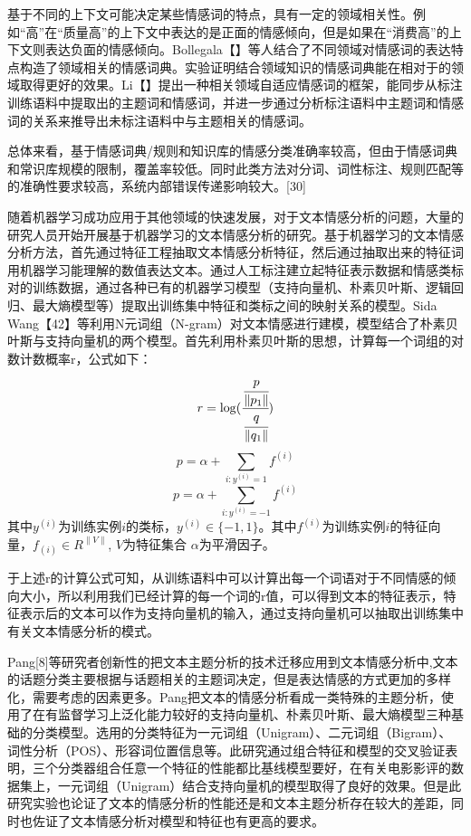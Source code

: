 基于不同的上下文可能决定某些情感词的特点，具有一定的领域相关性。例如“高”在“质量高”的上下文中表达的是正面的情感倾向，但是如果在“消费高”的上下文则表达负面的情感倾向。Bollegala【】等人结合了不同领域对情感词的表达特点构造了领域相关的情感词典。实验证明结合领域知识的情感词典能在相对于的领域取得更好的效果。Li【】提出一种相关领域自适应情感词的框架，能同步从标注训练语料中提取出的主题词和情感词，并进一步通过分析标注语料中主题词和情感词的关系来推导出未标注语料中与主题相关的情感词。

总体来看，基于情感词典/规则和知识库的情感分类准确率较高，但由于情感词典和常识库规模的限制，覆盖率较低。同时此类方法对分词、词性标注、规则匹配等的准确性要求较高，系统内部错误传递影响较大。[30]


随着机器学习成功应用于其他领域的快速发展，对于文本情感分析的问题，大量的研究人员开始开展基于机器学习的文本情感分析的研究。基于机器学习的文本情感分析方法，首先通过特征工程抽取文本情感分析特征，然后通过抽取出来的特征词用机器学习能理解的数值表达文本。通过人工标注建立起特征表示数据和情感类标对的训练数据，通过各种已有的机器学习模型（支持向量机、朴素贝叶斯、逻辑回归、最大熵模型等）提取出训练集中特征和类标之间的映射关系的模型。Sida Wang【42】等利用N元词组（N-gram）对文本情感进行建模，模型结合了朴素贝叶斯与支持向量机的两个模型。首先利用朴素贝叶斯的思想，计算每一个词组的对数计数概率r，公式如下：
$$r=\log(\cfrac{\cfrac{p}{\|p_1\|}}{\cfrac{q}{\|q_1\|}})$$
$$p=\alpha + \sum_{i:y^{(i)}=1}f^{(i)}$$
$$p=\alpha + \sum_{i:y^{(i)}=-1}f^{(i)}$$
其中$y^{(i)}$为训练实例$i$的类标，$y^{(i)}\in\lbrace-1,1\rbrace$。其中$f^{(i)}$为训练实例$i$的特征向量，$f_{(i)}\in R^{\|V\|}$, $V$为特征集合 $\alpha$为平滑因子。

于上述r的计算公式可知，从训练语料中可以计算出每一个词语对于不同情感的倾向大小，所以利用我们已经计算的每一个词的r值，可以得到文本的特征表示，特征表示后的文本可以作为支持向量机的输入，通过支持向量机可以抽取出训练集中有关文本情感分析的模式。

Pang[8]等研究者创新性的把文本主题分析的技术迁移应用到文本情感分析中,文本的话题分类主要根据与话题相关的主题词决定，但是表达情感的方式更加的多样化，需要考虑的因素更多。Pang把文本的情感分析看成一类特殊的主题分析，使用了在有监督学习上泛化能力较好的支持向量机、朴素贝叶斯、最大熵模型三种基础的分类模型。选用的分类特征为一元词组（Unigram）、二元词组（Bigram）、词性分析（POS）、形容词位置信息等。此研究通过组合特征和模型的交叉验证表明，三个分类器组合任意一个特征的性能都比基线模型要好，在有关电影影评的数据集上，一元词组（Unigram）结合支持向量机的模型取得了良好的效果。但是此研究实验也论证了文本的情感分析的性能还是和文本主题分析存在较大的差距，同时也佐证了文本情感分析对模型和特征也有更高的要求。

